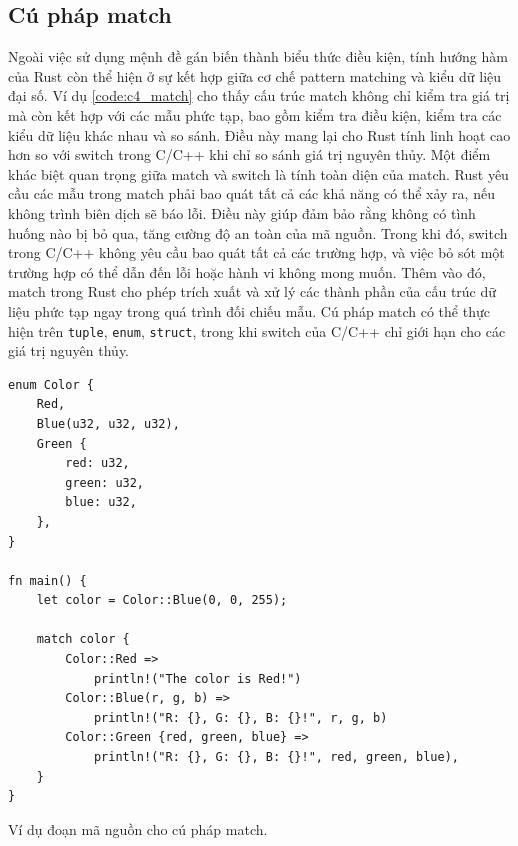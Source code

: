 \subsection{Cú pháp match}

Ngoài việc sử dụng mệnh đề gán biến thành biểu thức điều kiện, tính hướng hàm của Rust còn thể hiện ở sự kết hợp giữa cơ chế pattern matching và kiểu dữ liệu đại số.
Ví dụ \ref{code:c4_match} cho thấy cấu trúc match không chỉ kiểm tra giá trị mà còn kết hợp với các mẫu phức tạp, bao gồm kiểm tra điều kiện, kiểm tra các kiểu dữ liệu khác nhau và so sánh.
Điều này mang lại cho Rust tính linh hoạt cao hơn so với switch trong C/C++ khi chỉ so sánh giá trị nguyên thủy.
Một điểm khác biệt quan trọng giữa match và switch là tính toàn diện của match.
Rust yêu cầu các mẫu trong match phải bao quát tất cả các khả năng có thể xảy ra, nếu không trình biên dịch sẽ báo lỗi.
Điều này giúp đảm bảo rằng không có tình huống nào bị bỏ qua, tăng cường độ an toàn của mã nguồn.
Trong khi đó, switch trong C/C++ không yêu cầu bao quát tất cả các trường hợp, và việc bỏ sót một trường hợp có thể dẫn đến lỗi hoặc hành vi không mong muốn.
Thêm vào đó, match trong Rust cho phép trích xuất và xử lý các thành phần của cấu trúc dữ liệu phức tạp ngay trong quá trình đối chiếu mẫu.
Cú pháp match có thể thực hiện trên \texttt{tuple}, \texttt{enum}, \texttt{struct}, trong khi switch của C/C++ chỉ giới hạn cho các giá trị nguyên thủy.

\begin{listing}[H]
\begin{verbatim}
enum Color {
    Red,
    Blue(u32, u32, u32),
    Green {
        red: u32,
        green: u32,
        blue: u32,
    },
}

fn main() {
    let color = Color::Blue(0, 0, 255);

    match color {
        Color::Red =>
            println!("The color is Red!")
        Color::Blue(r, g, b) =>
            println!("R: {}, G: {}, B: {}!", r, g, b)
        Color::Green {red, green, blue} =>
            println!("R: {}, G: {}, B: {}!", red, green, blue),
    }
}
\end{verbatim}
\caption{Ví dụ đoạn mã nguồn cho cú pháp match.}
\label{code:c4_match}
\end{listing}

